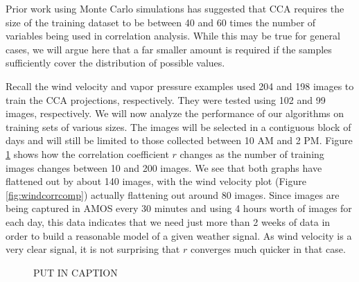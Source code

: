 Prior work \cite{barcikowski} using Monte Carlo simulations has suggested that CCA requires the size of the training dataset to be between 40 and 60 times the number of variables being used in correlation analysis. While this may be true for general cases, we will argue here that a far smaller amount is required if the samples sufficiently cover the distribution of possible values.

Recall the wind velocity  and vapor pressure examples used 204 and 198 images to train the CCA projections, respectively. They were tested using 102 and 99 images, respectively. We will now analyze the performance of our algorithms on training sets of various sizes. The images will be selected in a contiguous block of days and will still be limited to those collected between 10 AM and 2 PM. Figure \ref{fig:corrcomp} shows how the correlation coefficient $r$ changes as the number of training images changes between 10 and 200 images. We see that both graphs have flattened out by about 140 images, with the wind velocity plot (Figure \ref{fig:windcorrcomp}) actually flattening out around 80 images. Since images are being captured in AMOS every 30 minutes and using 4 hours worth of images for each day, this data indicates that we need just more than 2 weeks of data in order to build a reasonable model of a given weather signal. As wind velocity is a very clear signal, it is not surprising that $r$ converges much quicker in that case.

\begin{figure}
	\centering
	\caption[]{PUT IN CAPTION}
	\label{fig:corrcomp}
\end{figure}

